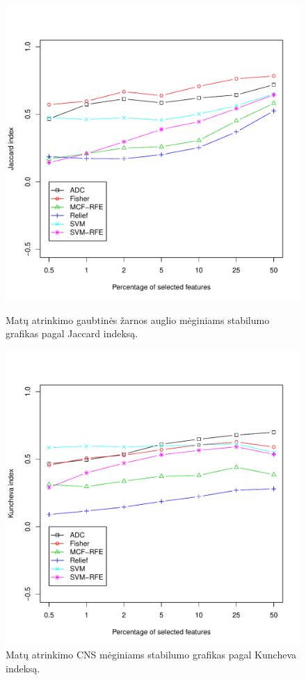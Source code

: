 \begin{figure}[H]
\begin{minipage}[b]{0.5\linewidth}
\includegraphics[width=.85\textwidth]{../bachelor/images/nncolon_robustness_jaccard.pdf}
\caption{Matų atrinkimo gaubtinės žarnos auglio mėginiams stabilumo grafikas pagal Jaccard indeksą.}
\label{fig:robj_colon}
\end{minipage}
\hspace{0.2cm}
\begin{minipage}[b]{0.5\linewidth}
\centering
\includegraphics[width=.85\textwidth]{../bachelor/images/nncns_robustness_kuncheva.pdf}
\caption{Matų atrinkimo CNS mėginiams stabilumo grafikas pagal Kuncheva indeksą.}

\end{minipage}
\end{figure}
